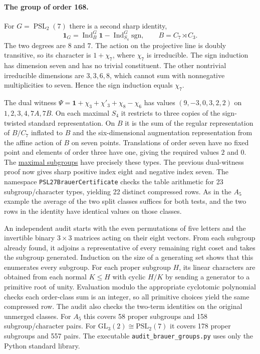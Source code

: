 \documentclass[11pt]{article}
\begin{document}
\paragraph{The group of order 168.}
For $G=\operatorname{PSL}_2(7)$ there is a second sharp identity,
\[
  \mathbf1_G=\operatorname{Ind}_{B}^{G}\mathbf1-
             \operatorname{Ind}_{S_4}^{G}\mathrm{sgn},
  \qquad B=C_7\rtimes C_3 .
\]
The two degrees are $8$ and $7$. The action on the projective line is doubly transitive, so its character is $1+\chi_7$, where $\chi_7$ is irreducible. The sign induction has dimension seven and has no trivial constituent. The other nontrivial irreducible dimensions are $3,3,6,8$, which cannot sum with nonnegative multiplicities to seven. Hence the sign induction equals $\chi_7$.

The dual witness $\Psi=\mathbf1+\chi_3+\chi'_3+\chi_8-\chi_6$ has values $(9,-3,0,3,2,2)$ on $1,2,3,4,7A,7B$. On each maximal $S_4$ it restricts to three copies of the sign-twisted standard representation. On $B$ it is the sum of the regular representation of $B/C_7$ inflated to $B$ and the six-dimensional augmentation representation from the affine action of $B$ on seven points. Translations of order seven have no fixed point and elements of order three have one, giving the required values $2$ and $0$. The \href{https://www.math.rwth-aachen.de/~Thomas.Breuer/ctbllib/ctbltoc/data/L3(2).html}{maximal subgroups} have precisely these types. The previous dual-witness proof now gives sharp positive index eight and negative index seven. The namespace \texttt{PSL27BrauerCertificate} checks the table arithmetic for 23 subgroup/character types, yielding 22 distinct compressed rows. As in the $A_5$ example the average of the two split classes suffices for both tests, and the two rows in the identity have identical values on those classes.

An independent audit starts with the even permutations of five letters and the invertible binary $3\times3$ matrices acting on their eight vectors. From each subgroup already found, it adjoins a representative of every remaining right coset and takes the subgroup generated. Induction on the size of a generating set shows that this enumerates every subgroup. For each proper subgroup $H$, its linear characters are obtained from each normal $K\le H$ with cyclic $H/K$ by sending a generator to a primitive root of unity. Evaluation modulo the appropriate cyclotomic polynomial checks each order-class sum is an integer, so all primitive choices yield the same compressed row. The audit also checks the two-term identities on the original unmerged classes. For $A_5$ this covers 58 proper subgroups and 158 subgroup/character pairs. For $\mathrm{GL}_3(2)\cong\mathrm{PSL}_2(7)$ it covers 178 proper subgroups and 557 pairs. The executable \texttt{audit\_brauer\_groups.py} uses only the Python standard library.
\end{document}
